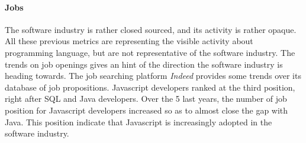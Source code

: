 


\paragraph{Jobs}

The software industry is rather closed sourced, and its activity is rather opaque.
All these previous metrics are representing the visible activity about programming language, but are not representative of the software industry.
The trends on job openings gives an hint of the direction the software industry is heading towards.
The job searching platform \textit{Indeed} provides some trends over its database of job propositions.
Javascript developers ranked at the third position, right after SQL and Java developers.
Over the 5 last years, the number of job position for Javascript developers increased so as to almost close the gap with Java.
This position indicate that Javascript is increasingly adopted in the software industry.


